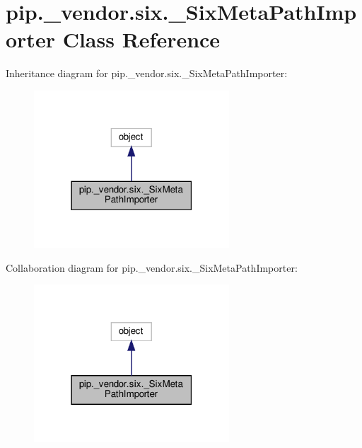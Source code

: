 \hypertarget{classpip_1_1__vendor_1_1six_1_1__SixMetaPathImporter}{}\section{pip.\+\_\+vendor.\+six.\+\_\+\+Six\+Meta\+Path\+Importer Class Reference}
\label{classpip_1_1__vendor_1_1six_1_1__SixMetaPathImporter}


Inheritance diagram for pip.\+\_\+vendor.\+six.\+\_\+\+Six\+Meta\+Path\+Importer\+:
\nopagebreak
\begin{figure}[H]
\begin{center}
\leavevmode
\includegraphics[width=207pt]{classpip_1_1__vendor_1_1six_1_1__SixMetaPathImporter__inherit__graph}
\end{center}
\end{figure}


Collaboration diagram for pip.\+\_\+vendor.\+six.\+\_\+\+Six\+Meta\+Path\+Importer\+:
\nopagebreak
\begin{figure}[H]
\begin{center}
\leavevmode
\includegraphics[width=207pt]{classpip_1_1__vendor_1_1six_1_1__SixMetaPathImporter__coll__graph}
\end{center}
\end{figure}
